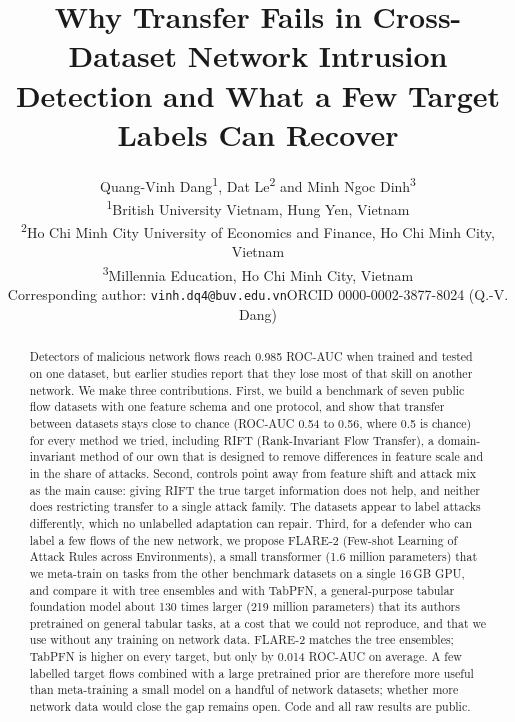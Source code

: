\documentclass[11pt]{article}
\title{Why Transfer Fails in Cross-Dataset Network Intrusion Detection and What a Few Target Labels Can Recover}
\author{Quang-Vinh Dang\textsuperscript{1}, Dat Le\textsuperscript{2} and Minh Ngoc Dinh\textsuperscript{3}\\
\textsuperscript{1}British University Vietnam, Hung Yen, Vietnam\\
\textsuperscript{2}Ho Chi Minh City University of Economics and Finance, Ho Chi Minh City, Vietnam\\
\textsuperscript{3}Millennia Education, Ho Chi Minh City, Vietnam\\
Corresponding author: \texttt{vinh.dq4@buv.edu.vn}\quad ORCID 0000-0002-3877-8024 (Q.-V. Dang)}
\date{}
\begin{document}
\maketitle

\begin{abstract}
Detectors of malicious network flows reach 0.985 ROC-AUC when trained and tested on one dataset, but earlier studies report that they lose most of that skill on another network.
We make three contributions.
First, we build a benchmark of seven public flow datasets with one feature schema and one protocol, and show that transfer between datasets stays close to chance (ROC-AUC 0.54 to 0.56, where 0.5 is chance) for every method we tried, including RIFT (Rank-Invariant Flow Transfer), a domain-invariant method of our own that is designed to remove differences in feature scale and in the share of attacks.
Second, controls point away from feature shift and attack mix as the main cause: giving RIFT the true target information does not help, and neither does restricting transfer to a single attack family.
The datasets appear to label attacks differently, which no unlabelled adaptation can repair.
Third, for a defender who can label a few flows of the new network, we propose FLARE-2 (Few-shot Learning of Attack Rules across Environments), a small transformer (1.6 million parameters) that we meta-train on tasks from the other benchmark datasets on a single 16\,GB GPU, and compare it with tree ensembles and with TabPFN, a general-purpose tabular foundation model about 130 times larger (219 million parameters) that its authors pretrained on general tabular tasks, at a cost that we could not reproduce, and that we use without any training on network data.
FLARE-2 matches the tree ensembles; TabPFN is higher on every target, but only by 0.014 ROC-AUC on average.
A few labelled target flows combined with a large pretrained prior are therefore more useful than meta-training a small model on a handful of network datasets; whether more network data would close the gap remains open.
Code and all raw results are public.
\end{abstract}
\end{document}

